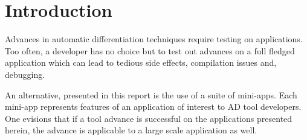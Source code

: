 \section{Introduction}
Advances in automatic differentiation techniques require testing on applications.
Too often, a developer has no choice but to test out advances on a full fledged application
which can lead to tedious side effects, compilation issues and, debugging.

An alternative, presented in this report is the use of a suite of mini-apps. Each mini-app 
represents features of an application of interest to AD tool developers. One evisions that if
a tool advance is successful on the applications presented herein, the advance is applicable
to a large scale application as well. 

